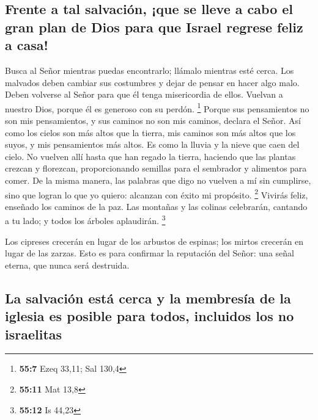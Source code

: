 \hypertarget{frente-a-tal-salvaciuxf3n-que-se-lleve-a-cabo-el-gran-plan-de-dios-para-que-israel-regrese-feliz-a-casa}{%
\subsection{Frente a tal salvación, ¡que se lleve a cabo el gran plan de
Dios para que Israel regrese feliz a
casa!}\label{frente-a-tal-salvaciuxf3n-que-se-lleve-a-cabo-el-gran-plan-de-dios-para-que-israel-regrese-feliz-a-casa}}

 Busca al Señor mientras puedas encontrarlo; llámalo
mientras esté cerca.  Los malvados deben cambiar sus
costumbres y dejar de pensar en hacer algo malo. Deben volverse al Señor
para que él tenga misericordia de ellos. Vuelvan a nuestro Dios, porque
él es generoso con su perdón. \footnote{\textbf{55:7} Ezeq 33,11; Sal
  130,4}  Porque sus pensamientos no son mis pensamientos,
y sus caminos no son mis caminos, declara el Señor.  Así
como los cielos son más altos que la tierra, mis caminos son más altos
que los suyos, y mis pensamientos más altos.  Es como la
lluvia y la nieve que caen del cielo. No vuelven allí hasta que han
regado la tierra, haciendo que las plantas crezcan y florezcan,
proporcionando semillas para el sembrador y alimentos para comer.
 De la misma manera, las palabras que digo no vuelven a
mí sin cumplirse, sino que logran lo que yo quiero: alcanzan con éxito
mi propósito. \footnote{\textbf{55:11} Mat 13,8}  Vivirás
feliz, enseñado los caminos de la paz. Las montañas y las colinas
celebrarán, cantando a tu lado; y todos los árboles aplaudirán.
\footnote{\textbf{55:12} Is 44,23}

 Los cipreses crecerán en lugar de los arbustos de
espinas; los mirtos crecerán en lugar de las zarzas. Esto es para
confirmar la reputación del Señor: una señal eterna, que nunca será
destruida.

\hypertarget{la-salvaciuxf3n-estuxe1-cerca-y-la-membresuxeda-de-la-iglesia-es-posible-para-todos-incluidos-los-no-israelitas}{%
\subsection{La salvación está cerca y la membresía de la iglesia es
posible para todos, incluidos los no
israelitas}\label{la-salvaciuxf3n-estuxe1-cerca-y-la-membresuxeda-de-la-iglesia-es-posible-para-todos-incluidos-los-no-israelitas}}

